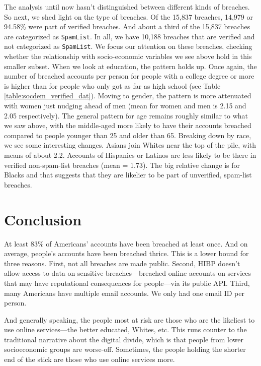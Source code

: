 \documentclass[12pt, letterpaper]{article}
\begin{document}
The analysis until now hasn't distinguished between different kinds of breaches. So next, we shed light on the type of breaches.  Of the 15,837 breaches, 14,979 or 94.58\% were part of verified breaches. And about a third of the 15,837 breaches are categorized as \texttt{SpamList}. In all, we have 10,188 breaches that are verified and not categorized as \texttt{SpamList}. We focus our attention on these breaches, checking whether the relationship with socio-economic variables we see above hold in this smaller subset. When we look at education, the pattern holds up. Once again, the number of breached accounts per person for people with a college degree or more is higher than for people who only got as far as high school (see Table \ref{table:socdem_verified_dat}). Moving to gender, the pattern is more attenuated with women just nudging ahead of men (mean for women and men is 2.15 and 2.05 respectively).  The general pattern for age remains roughly similar to what we saw above, with the middle-aged more likely to have their accounts breached compared to people younger than 25 and older than 65. Breaking down by race, we see some interesting changes. Asians join Whites near the top of the pile, with means of about 2.2. Accounts of Hispanics or Latinos are less likely to be there in verified non-spam-list breaches (mean = 1.73). The big relative change is for Blacks and that suggests that they are likelier to be part of unverified, spam-list breaches.



\section*{Conclusion}
At least 83\% of Americans' accounts have been breached at least once. And on average, people's accounts have been breached thrice. This is a lower bound for three reasons. First, not all breaches are made public. Second, HIBP doesn't allow access to data on sensitive breaches---breached online accounts on services that may have reputational consequences for people---via its public API. Third, many Americans have multiple email accounts. We only had one email ID per person. 

And generally speaking, the people most at risk are those who are the likeliest to use online services---the better educated, Whites, etc. This runs counter to the traditional narrative about the digital divide, which is that people from lower socioeconomic groups are worse-off. Sometimes, the people holding the shorter end of the stick are those who use online services more.
\end{document}
